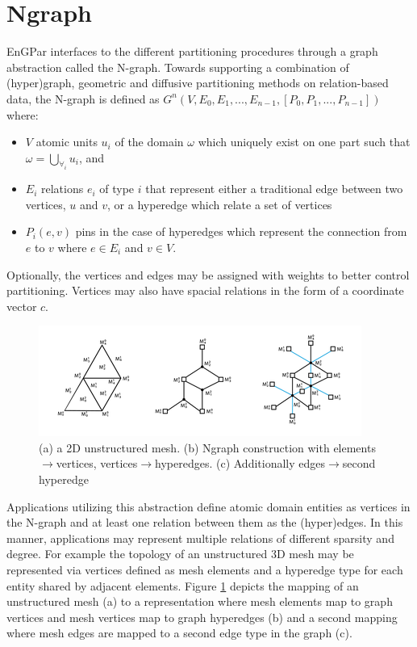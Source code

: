 \documentclass[a4paper]{article}
\begin{document}
\section{Ngraph}
EnGPar interfaces to the different partitioning procedures through a graph abstraction called the N-graph. Towards supporting a combination of (hyper)graph, geometric and diffusive partitioning methods on relation-based data, the N-graph is defined as $G^n(V,E_0,E_1,...,E_{n-1},[P_0,P_1,...,P_{n-1}])$ where:
\begin{itemize}
  \item $V$ atomic units $u_i$ of the domain $\omega$ which uniquely exist on one
    part such that $\omega = \bigcup_{\forall_i}u_i$, and 
  \item $E_i$ relations $e_i$ of type $i$ that represent either a traditional edge between two vertices, $u$ and $v$, or a hyperedge which relate a set of vertices
  \item $P_i(e,v)$ pins in the case of hyperedges which represent the connection
    from $e$ to $v$ where $e \in E_i$ and $v \in V$.
\end{itemize}
Optionally, the vertices and edges may be assigned with weights to better control partitioning. Vertices may also have spacial relations in the form of a coordinate vector $c$.

\begin{figure}[!ht]
  \centering
  \includegraphics[width=\textwidth]{exampleMesh2Graph.png}
  \caption{(a) a 2D unstructured mesh. (b) Ngraph construction with elements$\rightarrow$vertices, vertices$\rightarrow$hyperedges. (c) Additionally edges$\rightarrow$second hyperedge}
  \label{fig:Mesh2Graph}
\end{figure}

Applications utilizing this abstraction define atomic domain entities as vertices in the N-graph and at least one relation between them as the (hyper)edges. In this manner, applications may represent multiple relations of different sparsity and degree. For example the topology of an unstructured 3D mesh may be represented via vertices defined as mesh elements and a hyperedge type for each entity shared by adjacent elements. Figure \ref{fig:Mesh2Graph} depicts the mapping of an unstructured mesh (a) to a representation where mesh elements map to graph vertices and mesh vertices map to graph hyperedges (b) and a second mapping where mesh edges are mapped to a second edge type in the graph (c).
\end{document}
